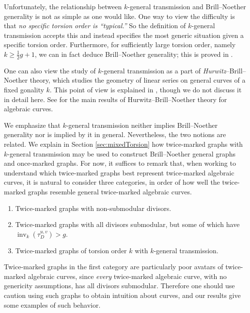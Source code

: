 \documentclass[11pt]{article}
\theoremstyle{definition}
\numberwithin{equation}{section}
\newcommand{\inv}{\operatorname{inv}}
\newcommand{\tauD}{\tau^{u,v}_D}
\begin{document}
Unfortunately, the relationship between $k$-general transmission and Brill--Noether generality is not as simple as one would like. One way to view the difficulty is that \emph{no specific torsion order is ``typical.''} So the definition of $k$-general transmission accepts this and instead specifies the most generic situation given a specific torsion order. Furthermore, for sufficiently large torsion order, namely $k \geq \frac12 g + 1$, we can in fact deduce Brill--Noether generality; this is proved in .

One can also view the study of $k$-general transmission as a part of \emph{Hurwitz}--Brill--Noether theory, which studies the geometry of linear series on general curves of a fixed gonality $k$. This point of view is explained in \cite{Pfl17}, though we do not discuss it in detail here. See \cite{larsonHBN,larsonLarsonVogt} for the main results of Hurwitz--Brill--Noether theory for algebraic curves.

We emphasize that $k$-general transmission neither implies Brill--Noether generality nor is implied by it in general. Nevertheless, the two notions are related.
We explain in Section \ref{sec:mixedTorsion} how twice-marked graphs with $k$-general transmission may be used to construct Brill--Noether general graphs and once-marked graphs. For now, it suffices to remark that, when working to understand which twice-marked graphs best represent twice-marked algebraic curves, it is natural to consider three categories, in order of how well the twice-marked graphs resemble general twice-marked algebraic curves.

\begin{enumerate}[label = \arabic*)]
    \item Twice-marked graphs with non-submodular divisors.
    \item Twice-marked graphs with all divisors submodular, but some of which have $\inv_k(\tauD) > g$.
    \item Twice-marked graphs of torsion order $k$ with $k$-general transmission.
\end{enumerate}

Twice-marked graphs in the first category are particularly poor avatars of twice-marked algebraic curves, since \emph{every} twice-marked algebraic curve, with no genericity assumptions, has all divisors submodular. Therefore one should use caution using such graphs to obtain intuition about curves, and our results give some examples of such behavior.
\end{document}
